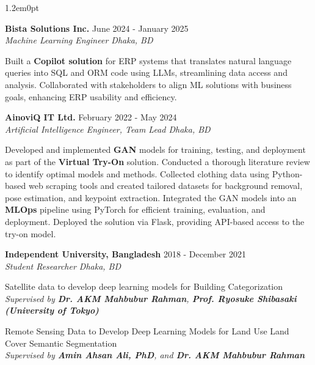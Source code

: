 \documentclass[a4paper,10pt]{article}
\begin{document}
\begin{adjustwidth}{1.2em}{0pt}
\vspace{0.1em}

\textbf{Bista Solutions Inc.} \hfill June 2024 - January 2025\\
\textit{Machine Learning Engineer \hfill Dhaka, BD}

\vspace{0.1em}

Built a \textbf{Copilot solution} for ERP systems that translates natural language queries into SQL and ORM code using LLMs, streamlining data access and analysis. Collaborated with stakeholders to align ML solutions with business goals, enhancing ERP usability and efficiency.

\vspace{0.1em}

\textbf{AinoviQ IT Ltd.} \hfill February 2022 - May 2024\\
\textit{Artificial Intelligence Engineer, Team Lead \hfill Dhaka, BD}

\vspace{0.1em}

Developed and implemented \textbf{GAN} models for training, testing, and deployment as part of the \textbf{Virtual Try-On} solution. Conducted a thorough literature review to identify optimal models and methods. Collected clothing data using Python-based web scraping tools and created tailored datasets for background removal, pose estimation, and keypoint extraction. Integrated the GAN models into an \textbf{MLOps} pipeline using PyTorch for efficient training, evaluation, and deployment. Deployed the solution via Flask, providing API-based access to the try-on model.

\vspace{0.1em}

\textbf{Independent University, Bangladesh} \hfill 2018 - December 2021\\
\textit{Student Researcher \hfill Dhaka, BD}

\vspace{0.1em}

Satellite data to develop deep learning models for Building Categorization\\
\textit{Supervised by \textbf{Dr. AKM Mahbubur Rahman}, \textbf{Prof. Ryosuke Shibasaki (University of Tokyo)}}

\vspace{0.1em}

Remote Sensing Data to Develop Deep Learning Models for Land Use Land Cover Semantic Segmentation\\
\textit{Supervised by \textbf{Amin Ahsan Ali, PhD}, and \textbf{Dr. AKM Mahbubur Rahman}}
\end{adjustwidth}
\end{document}
